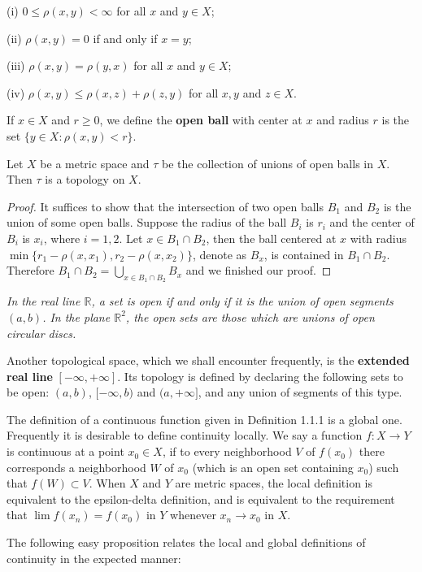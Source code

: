 (i) $0\le\rho(x,y)<\infty$ for all $x$ and $y\in X$;\par
(ii) $\rho(x,y)=0$ if and only if $x=y$;\par
(iii) $\rho(x,y)=\rho(y,x)$ for all $x$ and $y\in X$;\par
(iv) $\rho(x,y)\le\rho(x,z)+\rho(z,y)$ for all $x,y$ and $z\in X$.\par
If $x\in X$ and $r\ge 0$, we define the \textbf{open ball} with center at $x$ and radius $r$ is the set $\{y\in X:\rho(x,y)<r\}$.
\begin{proposition}
Let $X$ be a metric space and $\tau$ be the collection of unions of open balls in $X$. Then $\tau$ is a topology on $X$.
\end{proposition}
\begin{proof}
It suffices to show that the intersection of two open balls $B_1$ and $B_2$ is the union of some open balls. Suppose the radius of the ball $B_i$ is $r_i$ and the center of $B_i$ is $x_i$, where $i=1,2$. Let $x\in B_1\cap B_2$, then the ball centered at $x$ with radius $\min\{r_1-\rho(x,x_1),r_2-\rho(x,x_2)\}$, denote as $B_x$, is contained in $B_1\cap B_2$. Therefore $B_1\cap B_2=\bigcup_{x\in B_1\cap B_2}B_x$ and we finished our proof.
\end{proof}
\begin{example}\em
In the real line $\mathbb{R}$, a set is open if and only if it is the union of open segments $(a,b)$. In the plane $\mathbb{R}^2$, the open sets are those which are unions of open circular discs.
\end{example}
Another topological space, which we shall encounter frequently, is the \textbf{extended real line} $[-\infty,+\infty]$. Its topology is defined by declaring the following sets to be open: $(a,b)$, $[-\infty,b)$ and $(a,+\infty]$, and any union of segments of this type.\par
The definition of a continuous function given in Definition 1.1.1 is a global one. Frequently it is desirable to define continuity locally. We say a function $f:X\to Y$ is continuous at a point $x_0\in X$, if to every neighborhood $V$ of $f(x_0)$ there corresponds a neighborhood $W$ of $x_0$ (which is an open set containing $x_0$) such that $f(W)\subset V$. When $X$ and $Y$ are metric spaces, the local definition is equivalent to the epsilon-delta definition, and is equivalent to the requirement that $\lim f(x_n)=f(x_0)$ in $Y$ whenever $x_n\to x_0$ in $X$.\par
The following easy proposition relates the local and global definitions of continuity in the expected manner:
